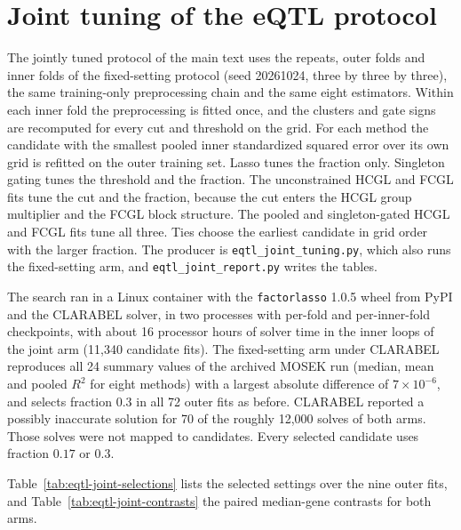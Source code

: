 \documentclass[11pt,a4paper]{article}
\begin{document}
\FloatBarrier

\section{Joint tuning of the eQTL protocol}\label{app:eqtl-joint}

The jointly tuned protocol of the main text uses the repeats, outer folds and
inner folds of the fixed-setting protocol (seed 20261024, three by three by
three), the same training-only preprocessing chain and the same eight
estimators. Within each inner fold the preprocessing is fitted once, and the
clusters and gate signs are recomputed for every cut and threshold on the
grid. For each method the candidate with the smallest pooled inner
standardized squared error over its own grid is refitted on the outer
training set. Lasso tunes the fraction only. Singleton gating tunes the
threshold and the fraction. The unconstrained HCGL and FCGL fits tune the cut
and the fraction, because the cut enters the HCGL group multiplier and the
FCGL block structure. The pooled and singleton-gated HCGL and FCGL fits tune
all three. Ties choose the earliest candidate in grid order with the larger
fraction. The producer is \nolinkurl{eqtl_joint_tuning.py}, which also runs the
fixed-setting arm, and \nolinkurl{eqtl_joint_report.py} writes the tables.

The search ran in a Linux container with the \texttt{factorlasso} 1.0.5 wheel
from PyPI and the CLARABEL solver, in two processes with per-fold and
per-inner-fold checkpoints, with about 16 processor hours of solver time in
the inner loops of the joint arm (11,340 candidate fits). The fixed-setting
arm under CLARABEL reproduces all 24 summary values of the archived MOSEK run
(median, mean and pooled $R^2$ for eight methods) with a largest absolute
difference of $7\times10^{-6}$, and selects fraction $0.3$ in all 72 outer
fits as before. CLARABEL reported a possibly inaccurate solution for 70 of
the roughly 12,000 solves of both arms. Those solves were not mapped to candidates. Every
selected candidate uses fraction $0.17$ or $0.3$.

Table~\ref{tab:eqtl-joint-selections} lists the selected settings over the
nine outer fits, and Table~\ref{tab:eqtl-joint-contrasts} the paired
median-gene contrasts for both arms.
\end{document}
